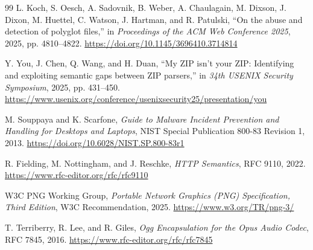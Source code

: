 \documentclass[preprint,12pt]{elsarticle}
\begin{document}
\begin{thebibliography}{99}
L. Koch, S. Oesch, A. Sadovnik, B. Weber, A. Chaulagain, M. Dixson,
J. Dixon, M. Huettel, C. Watson, J. Hartman, and R. Patulski, ``On the
abuse and detection of polyglot files,'' in \emph{Proceedings of the ACM Web
Conference 2025}, 2025, pp. 4810--4822.
\url{https://doi.org/10.1145/3696410.3714814}

Y. You, J. Chen, Q. Wang, and H. Duan, ``My ZIP isn't your ZIP: Identifying
and exploiting semantic gaps between ZIP parsers,'' in \emph{34th USENIX
Security Symposium}, 2025, pp. 431--450.
\url{https://www.usenix.org/conference/usenixsecurity25/presentation/you}

M. Souppaya and K. Scarfone, \emph{Guide to Malware Incident Prevention
and Handling for Desktops and Laptops}, NIST Special Publication 800-83
Revision 1, 2013. \url{https://doi.org/10.6028/NIST.SP.800-83r1}

R. Fielding, M. Nottingham, and J. Reschke, \emph{HTTP Semantics},
RFC 9110, 2022. \url{https://www.rfc-editor.org/rfc/rfc9110}

W3C PNG Working Group, \emph{Portable Network Graphics (PNG)
Specification, Third Edition}, W3C Recommendation, 2025.
\url{https://www.w3.org/TR/png-3/}

T. Terriberry, R. Lee, and R. Giles, \emph{Ogg Encapsulation for the Opus
Audio Codec}, RFC 7845, 2016.
\url{https://www.rfc-editor.org/rfc/rfc7845}

\end{thebibliography}
\end{document}

